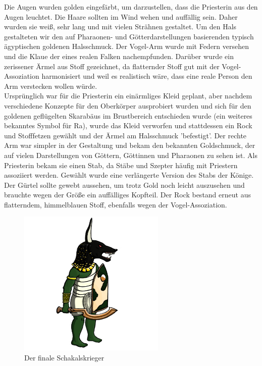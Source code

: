 \documentclass[extern,palatino]{cgBA}
\begin{document}
Die Augen wurden golden eingefärbt, um darzustellen, dass die Priesterin aus den Augen leuchtet. Die Haare sollten im Wind wehen und auffällig sein. Daher wurden sie weiß, sehr lang und mit vielen Strähnen gestaltet. Um den Hals gestalteten wir den auf Pharaonen- und Götterdarstellungen basierenden typisch ägyptischen goldenen Halsschmuck. Der Vogel-Arm wurde mit Federn versehen und die Klaue der eines realen Falken nachempfunden. Darüber wurde ein zerissener Ärmel aus Stoff gezeichnet, da flatternder Stoff gut mit der Vogel-Assoziation harmonisiert und weil es realistisch wäre, dass eine reale Person den Arm verstecken wollen würde.
\\Ursprünglich war für die Priesterin ein einärmliges Kleid geplant, aber nachdem verschiedene Konzepte für den Oberkörper ausprobiert wurden und sich für den goldenen geflügelten Skarabäus im Brustbereich entschieden wurde (ein weiteres bekanntes Symbol für Ra\cite{ra}), wurde das Kleid verworfen und stattdessen ein Rock und Stofffetzen gewählt und der Ärmel am Halsschmuck 'befestigt'. Der rechte Arm war simpler in der Gestaltung und bekam den bekannten Goldschmuck, der auf vielen Darstellungen von Göttern, Göttinnen und Pharaonen zu sehen ist. Als Priesterin bekam sie einen Stab, da Stäbe und Szepter häufig mit Priestern assoziiert werden. Gewählt wurde eine verlängerte Version des Stabs der Könige. Der Gürtel sollte gewebt aussehen, um trotz Gold noch leicht auszusehen und brauchte wegen der Größe ein auffälliges Kopfteil. Der Rock bestand erneut aus flatterndem, himmelblauen Stoff, ebenfalls wegen der Vogel-Assoziation.

\newpage
\begin{figure}[H]
	\centering
	\includegraphics[height=7cm]{jackal.jpg}
	\caption{Der finale Schakalskrieger}
	\label{jackal}
\end{figure}
\end{document}
